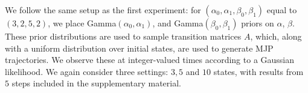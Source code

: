 


We follow the same setup as the first experiment:
for $(\alpha_0,\alpha_1,\beta_0,\beta_1)$ equal to $(3,2,5,2)$,
we place Gamma$(\alpha_0,\alpha_1)$, and Gamma$(\beta_0, \beta_1)$ priors on $\alpha$, $\beta$. 
These prior distributions are used to sample transition matrices $A$, which, along with a uniform distribution over initial states, are used to generate MJP trajectories. 
We observe these at integer-valued times according to a Gaussian likelihood.
We again consider three settings: $3, 5$ and $10$ states, with results from $5$ steps included in the supplementary material. 

